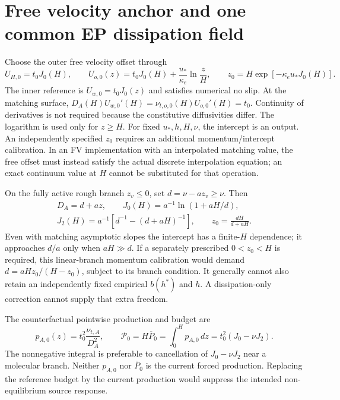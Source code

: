\documentclass[11pt,a4paper]{article}
\numberwithin{equation}{section}
\begin{document}
\section{Free velocity anchor and one common EP dissipation field}
\label{sec:wj-wall-ep}

Choose the outer free velocity offset through
\begin{equation}
 U_{H,0}=t_0J_0(H),\qquad
 U_{o,0}(z)=t_0J_0(H)+\frac{u_*}{\kappa_e}\ln\frac zH,
 \qquad z_0=H\exp[-\kappa_e u_*J_0(H)].
 \label{eq:wj-wall-anchor}
\end{equation}
The inner reference is $U_{w,0}=t_0J_0(z)$ and satisfies numerical
no slip. At the matching surface,
$D_A(H)U_{w,0}'(H)=\nu_{t,o,0}(H)U_{o,0}'(H)=t_0$.
Continuity of derivatives is not required because the constitutive
diffusivities differ. The logarithm is used only for $z\geq H$.
For fixed $u_*,h,H,\nu$, the intercept is an output. An independently
specified $z_0$ requires an additional momentum/intercept calibration.
In an FV implementation with an interpolated matching value, the free
offset must instead satisfy the actual discrete interpolation equation;
an exact continuum value at $H$ cannot be substituted for that operation.

On the fully active rough branch $z_v\leq0$, set $d=\nu-az_v\geq\nu$.
Then
\begin{equation}
 \begin{gathered}
 D_A=d+az,\qquad J_0(H)=a^{-1}\ln(1+aH/d),\\
 J_2(H)=a^{-1}[d^{-1}-(d+aH)^{-1}],\qquad
 \boxed{z_0=\frac{dH}{d+aH}.}
 \end{gathered}
 \label{eq:wj-wall-rough-anchor}
\end{equation}
Even with matching asymptotic slopes the intercept has a finite-$H$
dependence; it approaches $d/a$ only when $aH\gg d$. If a separately
prescribed $0<z_0<H$ is required, this linear-branch momentum calibration
would demand $d=aHz_0/(H-z_0)$, subject to its branch condition. It
generally cannot also retain an independently fixed empirical $b(h^*)$
and $h$. A dissipation-only correction cannot supply that extra freedom.

The counterfactual pointwise production and budget are
\begin{equation}
 \boxed{p_{A,0}(z)=t_0^2\frac{\nu_{t,A}}{D_A^2},\qquad
 \mathcal P_0=H\overline P_0=\int_0^H p_{A,0}\,dz
 =t_0^2(J_0-\nu J_2).}
 \label{eq:wj-wall-budget}
\end{equation}
The nonnegative integral is preferable to cancellation of $J_0-\nu J_2$
near a molecular branch. Neither $p_{A,0}$ nor $\overline P_0$ is the
current forced production. Replacing the reference budget by the current
production would suppress the intended non-equilibrium source response.
\end{document}
